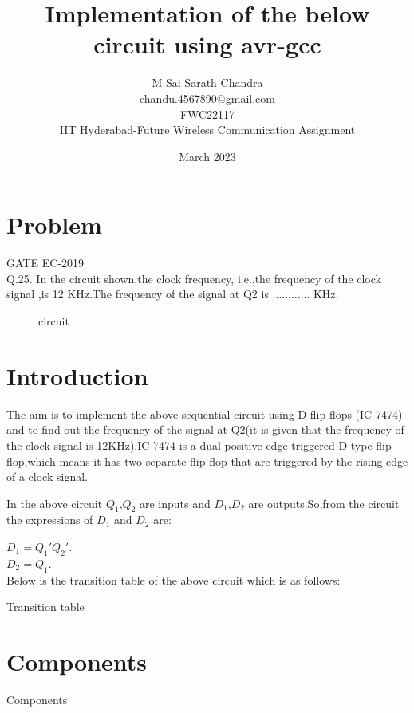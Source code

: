\documentclass{article}
\title{Implementation of the below circuit using avr-gcc}
\date{March 2023}
\author{M Sai Sarath Chandra\\chandu.4567890@gmail.com\\FWC22117\\IIT Hyderabad-Future Wireless Communication Assignment}
\begin{document}
\maketitle
	\tableofcontents

\pagebreak

\section{Problem}
	{GATE EC-2019}\\
	Q.25. In the circuit shown,the clock frequency, i.e.,the frequency of the clock signal ,is 12 KHz.The frequency of the signal at Q2 is ............ KHz.
	\begin{figure}[h]
	\centering
		
		\caption{circuit}
		\label{fig:1}
	\end{figure}

\section{Introduction}
		
		The aim is to implement the above sequential circuit using D flip-flops (IC 7474) and to find out the frequency of the signal at Q2(it is given that the frequency of the clock signal is 12KHz).IC 7474 is a dual positive edge triggered D type flip flop,which means it has two separate flip-flop that are triggered by the rising edge of a clock signal.

		In the above circuit $Q_1$,$Q_2$ are inputs and $D_1$,$D_2$ are outputs.So,from the circuit the expressions of $D_1$ and $D_2$ are:

		$D_1 = Q_1'Q_2'$.\\
			$D_2 = Q_1$.\\

Below is the transition table of the above circuit which is as follows:
\pagebreak

	\begin{table}[h]
		\begin{center}
			
			\caption{Transition table}
			\label{table:2}
		\end{center}
	\end{table}

\section{Components}
	
	\begin{table}[h]
		\begin{center}
			
			\caption{Components}
			\label{table:1}
		\end{center}
	\end{table}
\end{document}
